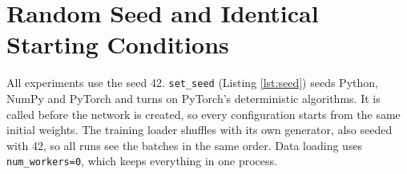 \section{Random Seed and Identical Starting Conditions}
\label{sec:seed}

All experiments use the seed 42. \texttt{set\_seed} (Listing
\ref{lst:seed}) seeds Python, NumPy and PyTorch and turns on PyTorch's
deterministic algorithms. It is called before the network is created, so
every configuration starts from the same initial weights. The training
loader shuffles with its own generator, also seeded with 42, so all runs
see the batches in the same order. Data loading uses
\texttt{num\_workers=0}, which keeps everything in one process.


